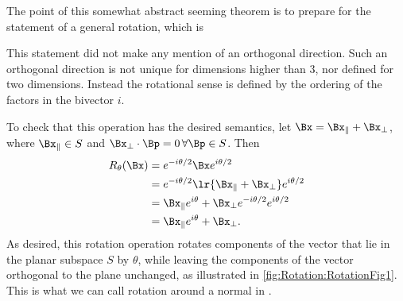 The point of this somewhat abstract seeming theorem is to prepare for the statement of a general  rotation, which is

This statement did not make any mention of an orthogonal direction.
Such an orthogonal direction is not unique for dimensions higher than 3, nor defined for two dimensions.
Instead the rotational sense is defined by the ordering of the factors in the bivector \( i \).

To check that this operation has the desired semantics,
let \( \Bx = \Bx_\parallel + \Bx_\perp \), where \( \Bx_\parallel \in S \) and \( \Bx_\perp \cdot \Bp = 0 \,\forall \Bp \in S \).
Then
\begin{equation}\label{eqn:generalRotation:1880}
\begin{aligned}
R_\theta(\Bx)
&= e^{ - i \theta/2 } \Bx e^{ i\theta/2 } \\
&= e^{ - i \theta/2 } \lr{ \Bx_\parallel + \Bx_\perp } e^{ i\theta/2 } \\
&= \Bx_\parallel e^{ i\theta } + \Bx_\perp e^{ - i \theta/2 } e^{ i\theta/2 } \\
&= \Bx_\parallel e^{ i\theta } + \Bx_\perp.
\end{aligned}
\end{equation}
As desired, this rotation operation
rotates components of the vector that lie in the planar subspace \( S \) by \( \theta \), while leaving the components of the vector orthogonal to the plane unchanged, as illustrated in \cref{fig:Rotation:RotationFig1}.
This is what we can call rotation around a normal in .


